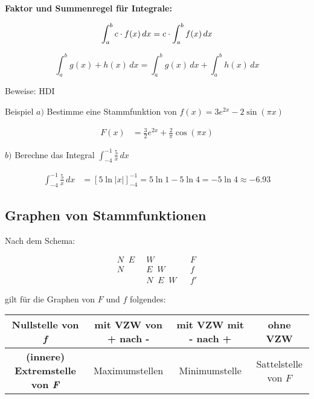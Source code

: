 \documentclass{article}
\begin{document}
\textbf{Faktor und Summenregel für Integrale:}

\[\int_a^b c \cdot f(x) \, dx = c \cdot \int_a^b f(x) \, dx \\\]

\[\int_a^b g(x) + h(x) \, dx = \int_a^b g(x) \, dx + \int_a^b h(x) \, dx\]

Beweise: HDI

\begin{boxx}[DarkBlue]{Beispiel}
    $a)$\hspace{3mm} Bestimme eine Stammfunktion von $\displaystyle f(x) = 3e^{2x}-2 \sin(\pi x)$

    \begin{align*}
        F(x) &= \frac{3}{2} e^{2x} + \frac{2}{\pi} \cos(\pi x)
    \end{align*}

    $b)$\hspace{3mm} Berechne das Integral $\displaystyle \int_{-4}^{-1} \frac{5}{x} \, dx$

    \begin{align*}
        \int_{-4}^{-1} \frac{5}{x} \, dx &= \left[5 \ln |x|\right]_{-4}^{-1} 
        = 5 \ln 1 - 5\ln 4 = -5\ln 4 \approx -6.93
    \end{align*}
\end{boxx}
\newpage

\subsection{Graphen von Stammfunktionen}
Nach dem Schema:

\begin{align*}
    &&N \;\; E \;\; &W && F &&\\
    &&N \;\; &E \;\; W && f &&\\
    &&&N \;\; E \;\; W && f' &&
\end{align*}

gilt für die Graphen von $F$ und $f$ folgendes:

\begin{table}[H]
    \centering
    \begin{tabular}{|c|c|c|c|}
        \hline
         \textbf{Nullstelle von \emph{f}} & mit VZW von + nach - & mit VZW mit - nach + & ohne VZW  \\
         \hline
         \textbf{(innere) Extremstelle von \emph{F}} & Maximumstellen & Minimumstelle & Sattelstelle von $F$  \\
         \hline
    \end{tabular}
\end{table}
\end{document}
